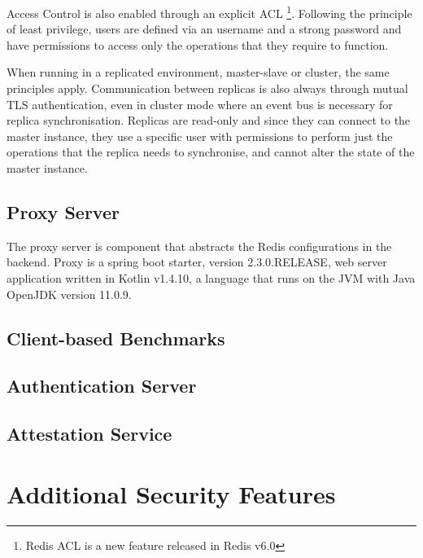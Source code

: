 Access Control is also enabled through an explicit \gls{ACL} \footnote{Redis ACL is a new feature released in Redis v6.0}. Following the principle of least privilege, users are defined via an username and a strong password and have permissions to access only the operations that they require to function.

When running in a replicated environment, master-slave or cluster, the same principles apply. Communication between replicas is also always through mutual \gls{TLS} authentication, even in cluster mode where an event bus is necessary for replica synchronisation. Replicas are read-only and since they can connect to the master instance, they use a specific user with permissions to perform just the operations that the replica needs to synchronise, and cannot alter the state of the master instance.

\subsection{Proxy Server}
\label{ssec:proxy_server}

The proxy server is component that abstracts the Redis configurations in the backend. Proxy is a spring boot starter, version 2.3.0.RELEASE, web server application written in Kotlin v1.4.10, a language that runs on the \gls{JVM} with Java OpenJDK version 11.0.9.


\subsection{Client-based Benchmarks}
\label{ssec:client_based_benchmarks}

\subsection{Authentication Server}
\label{ssec:implementation_authentication_server}

\subsection{Attestation Service}
\label{ssec:attestation_service}

\section{Additional Security Features}
\label{sec:additional_security_features}

